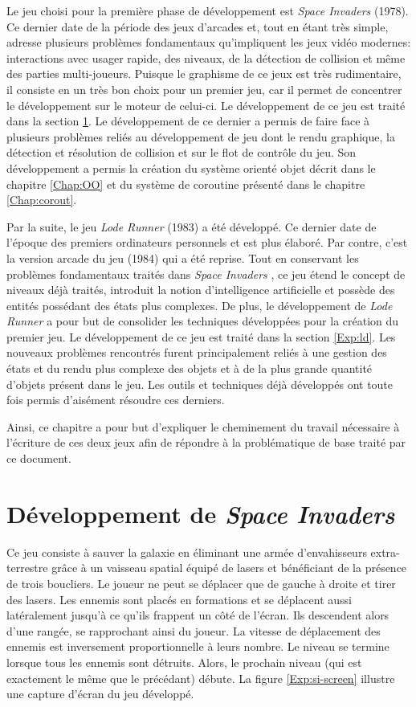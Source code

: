 \documentclass[12pt,twoside,letterpaper,francais]{book}
\newcommand{\lr}{{\textit{Lode Runner }}}
\newcommand{\si}{{\textit{Space Invaders }}}
\begin{document}
Le jeu choisi pour la première phase de développement est \si
(1978). Ce dernier date de la période des jeux d'arcades et, tout en
étant très simple, adresse plusieurs problèmes fondamentaux
qu'impliquent les jeux vidéo modernes: interactions avec usager
rapide, des niveaux, de la détection de collision et même des parties
multi-joueurs. Puisque le graphisme de ce jeux est très rudimentaire,
il consiste en un très bon choix pour un premier jeu, car il permet de
concentrer le développement sur le moteur de celui-ci. Le
développement de ce jeu est traité dans la section \ref{Exp:SI}. Le
développement de ce dernier a permis de faire face à plusieurs
problèmes reliés au développement de jeu dont le rendu graphique, la
détection et résolution de collision et sur le flot de contrôle du
jeu. Son développement a permis la création du système orienté objet
décrit dans le chapitre \ref{Chap:OO} et du système de coroutine
présenté dans le chapitre \ref{Chap:corout}.

Par la suite, le jeu \lr (1983) a été développé. Ce dernier date de
l'époque des premiers ordinateurs personnels et est plus élaboré. Par
contre, c'est la version arcade du jeu (1984) qui a été reprise. Tout
en conservant les problèmes fondamentaux traités dans \si, ce jeu
étend le concept de niveaux déjà traités, introduit la notion
d'intelligence artificielle et possède des entités possédant des états
plus complexes. De plus, le développement de \lr a pour but de
consolider les techniques développées pour la création du premier
jeu. Le développement de ce jeu est traité dans la section
\ref{Exp:ld}. Les nouveaux problèmes rencontrés furent principalement
reliés à une gestion des états et du rendu plus complexe des objets et
à de la plus grande quantité d'objets présent dans le jeu. Les outils
et techniques déjà développés ont toute fois permis d'aisément
résoudre ces derniers.

Ainsi, ce chapitre a pour but d'expliquer le cheminement du travail
nécessaire à l'écriture de ces deux jeux afin de répondre à la
problématique de base traité par ce document.


\FloatBarrier
\section{Développement de \si} \label{Exp:SI}
Ce jeu consiste à \og sauver la galaxie \fg en éliminant une armée
d'envahisseurs extra-terrestre grâce à un vaisseau spatial équipé de
lasers et bénéficiant de la présence de trois boucliers. Le joueur ne
peut se déplacer que de gauche à droite et tirer des lasers. Les
ennemis sont placés en formations et se déplacent aussi latéralement
jusqu'à ce qu'ils frappent un côté de l'écran. Ils descendent alors
d'une rangée, se rapprochant ainsi du joueur. La vitesse de
déplacement des ennemis est inversement proportionnelle à leurs
nombre. Le niveau se termine lorsque tous les ennemis sont
détruits. Alors, le prochain niveau (qui est exactement le même que le
précédant) débute. La figure \ref{Exp:si-screen} illustre une capture
d'écran du jeu développé.
\end{document}
